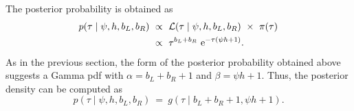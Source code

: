 The posterior probability is obtained as
\begin{equation}\label{eq:rec_post}
\begin{split}
	p(\tau \mid \psi,h,b_L,b_R)
	&~\propto~
	\mathcal{L}(\tau \mid \psi, h, b_L, b_R)~\times~\pi(\tau) \\
	&~\propto~
	\tau^{b_L + b_R} \,\,\mathrm{e}^{-\tau(\psi h +1)}\text{.}
\end{split}
\end{equation}
As in the previous section, the form of the posterior probability obtained above suggests a Gamma \gls{pdf} with ${\alpha = b_L + b_R +1}$ and ${\beta = \psi h +1}$.
Thus, the posterior density can be computed as
\begin{equation}
	p(\tau \mid \psi,h,b_L,b_R)~=~g(\tau\mid b_L + b_R +1, \psi h +1)\text{.}
\end{equation}




